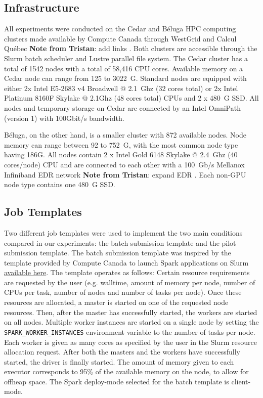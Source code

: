 \documentclass{IEEEtran}
\newcommand{\tristan}[1]{\color{red}\textbf{Note from Tristan}:
      #1 \color{black}}
\newcommand{\TG}[1]{\tristan{#1}}
\begin{document}
    \subsection{Infrastructure}
    All experiments were conducted on the Cedar and B\'eluga HPC computing clusters
    made available by Compute Canada through WestGrid and Calcul Qu\'ebec \TG{add links}. Both 
    clusters are accessible through the Slurm batch scheduler and Lustre parallel file system.
    The Cedar cluster has a total of 1542 nodes
    with a total of 58,416 CPU cores. Available memory on a Cedar node can range
    from 125 to 3022~G. Standard nodes are equipped with either 2x Intel E5-2683 v4
    Broadwell @ 2.1~Ghz (32 cores total) or 2x Intel Platinum 8160F Skylake @
    2.1Ghz (48 cores total) CPUs and 
    2 x 480~G SSD. All nodes and temporary storage on Cedar are connected by an 
    Intel OmniPath (version 1) with 100Gbit/s bandwidth.

    B\'eluga, on the other hand, is a smaller cluster with 872 available nodes. 
    Node memory can range between 92 to 752~G, with the most common node type having 
    186G. All nodes contain 2 x Intel Gold 6148
    Skylake @ 2.4~Ghz (40 cores/node) CPU and are connected to each other with a
    100~Gb/s Mellanox Infiniband EDR network \TG{expand EDR}. Each non-GPU node type contains one 
    480~G SSD. 

    \subsection{Job Templates}

    Two different job templates were used to implement the two main
    conditions compared in our experiments: the batch submission
    template and the pilot submission template. The batch submission template was
    inspired by the template provided by Compute Canada to launch Spark applications 
    on Slurm \href{https://docs.computecanada.ca/wiki/Apache\_Spark/en}{available here}.
    The template operates as follows: Certain resource requirements are requested by
    the user (e.g. walltime, amount of memory per node, number of CPUs per task, number 
    of nodes and number of tasks per node). Once these resources are allocated, a 
    master is started on one of the requested node resources. Then, after the master
    has successfully started, the workers are started on all nodes. Multiple worker
    instances are started on a single node by setting the \texttt{SPARK\_WORKER\_INSTANCES}
    environment variable to the number of tasks per node. Each worker is given as many
     cores as specified by the user in the Slurm resource allocation request.
    After both the masters and the workers have successfully started, the driver is finally
    started. The amount of memory given to each executor corresponds to 95\% of the 
    available memory on the node, to allow for offheap space. 
    The Spark deploy-mode selected for the batch template is client-mode. 
\end{document}
